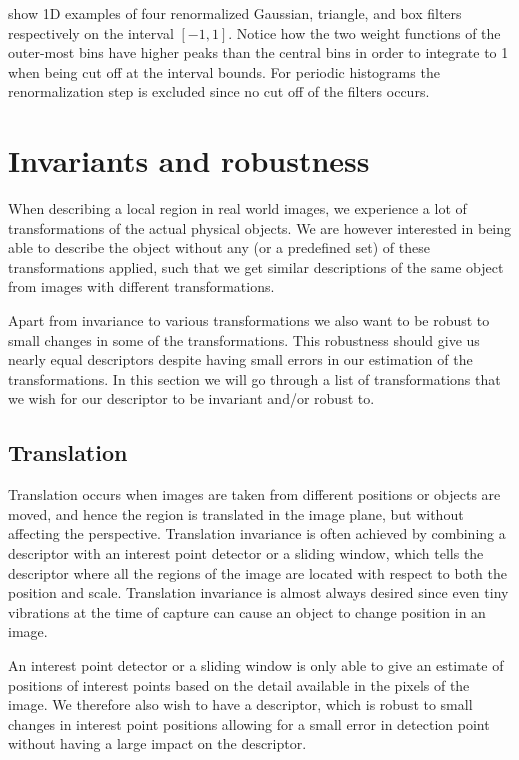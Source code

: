 \documentclass[thesis.tex]{subfiles}
\begin{document}
 show 1D examples of four renormalized Gaussian, triangle, and box filters respectively on the interval $[-1,1]$. Notice how the two weight functions of the outer-most bins have higher peaks than the central bins in order to integrate to 1 when being cut off at the interval bounds. For periodic histograms the renormalization step is excluded since no cut off of the filters occurs.
%
\section{Invariants and robustness}
When describing a local region in real world images, we experience a lot of transformations of the actual physical objects. We are however interested in being able to describe the object without any (or a predefined set) of these transformations applied, such that we get similar descriptions of the same object from images with different transformations.

Apart from invariance to various transformations we also want to be robust to small changes in some of the transformations. This robustness should give us nearly equal descriptors despite having small errors in our estimation of the transformations.
In this section we will go through a list of transformations that we wish for our descriptor to be invariant and/or robust to.

\subsection{Translation}
\label{sec:translation}
Translation occurs when images are taken from different positions or objects are moved, and hence the region is translated in the image plane, but without affecting the perspective. Translation invariance is often achieved by combining a descriptor with an interest point detector or a sliding window, which tells the descriptor where all the regions of the image are located with respect to both the position and scale. Translation invariance is almost always desired since even tiny vibrations at the time of capture can cause an object to change position in an image.

An interest point detector or a sliding window is only able to give an estimate of positions of interest points based on the detail available in the pixels of the image. We therefore also wish to have a descriptor, which is robust to small changes in interest point positions allowing for a small error in detection point without having a large impact on the descriptor.
\end{document}
